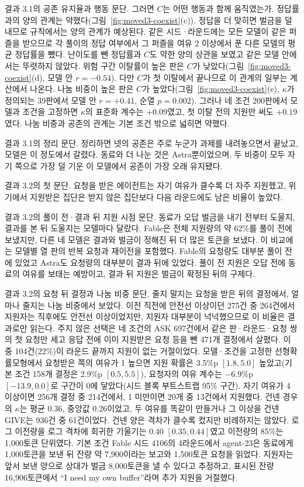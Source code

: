 결과 3.1의 공존 유지율과 행동 문단.
그러면 $C$는 어떤 행동과 함께 움직였는가. 정답률과의 양의 관계는 약했다(그림~\ref{fig:moved3-coexist}(c)). 정답을 더 맞히면 벌금을 덜 내므로 규칙에서는 양의 관계가 예상된다. 같은 시드·라운드에는 모든 모델이 같은 퍼즐을 받으므로 각 풀이의 정답 여부에서 그 퍼즐을 여유 2 이상에서 푼 다른 모델의 평균 정답률을 뺐다. 난이도를 뺀 정답률과 $C$도 약한 양의 상관을 보였고 같은 모델 안에서는 뚜렷하지 않았다. 위험 구간 이탈률이 높은 판은 $C$가 낮았다(그림~\ref{fig:moved3-coexist}(d), 모델 안 $r=-0.54$). 다만 $C$가 첫 이탈에서 끝나므로 이 관계의 일부는 계산에서 나온다. 나눔 비중이 높은 판은 $C$가 높았다(그림~\ref{fig:moved3-coexist}(e), $\kappa$가 정의되는 39판에서 모델 안 $r=+0.41$, 순열 $p=0.002$). 그러나 네 조건 200판에서 모델과 조건을 고정하면 $\kappa$의 표준화 계수는 $+0.09$였고, 첫 이탈 전의 지원만 써도 $+0.19$였다. 나눔 비중과 공존의 관계는 기본 조건 밖으로 넓히면 약했다.

결과 3.1의 정리 문단.
정리하면 넷의 공존은 주로 누군가 과제를 내려놓으면서 끝났고, 모델은 이 정도에서 갈렸다. 동료와 더 나눈 것은 Astra뿐이었으며, 두 비중이 모두 자기 쪽으로 가장 덜 기운 이 모델에서 공존이 가장 오래 유지됐다.

결과 3.2의 첫 문단.
요청을 받은 에이전트는 자기 여유가 클수록 더 자주 지원했고, 위기에서 지원받은 집단은 받지 않은 집단보다 다음 라운드에도 남은 비율이 높았다.

결과 3.2의 풀이 전·결과 뒤 지원 시점 문단.
동료가 오답 벌금을 내기 전부터 도울지, 결과를 본 뒤 도울지는 모델마다 달랐다. Fable은 전체 지원량의 약 62\%를 풀이 전에 보냈지만, 다른 네 모델은 결과와 벌금이 정해진 뒤 더 많은 토큰을 보냈다. 이 비교에는 모델별 열 판의 반복 요청과 재이전을 포함했다. Fable의 요청량도 대부분 풀이 전에 있었고 Astra도 요청량의 대부분이 결과 뒤에 있었다. 풀이 전 지원은 오답 전에 동료의 여유를 보태는 예방이고, 결과 뒤 지원은 벌금이 확정된 뒤의 구제다.

결과 3.2의 요청 뒤 결정과 나눔 비중 문단.
줄지 말지는 요청을 받은 뒤의 결정에서, 얼마나 줄지는 나눔 비중에서 보았다. 이전 직전에 안전선 이상이던 275건 중 264건에서 지원자는 직후에도 안전선 이상이었지만, 지원자 대부분이 넉넉했으므로 이 비율은 결과로만 읽는다. 주지 않은 선택은 네 조건의 ASK 697건에서 같은 판·라운드·요청 쌍의 첫 요청만 세고 응답 전에 이미 지원받은 요청 등을 뺀 471개 결정에서 살폈다. 이 중 104건(22\%)이 라운드 끝까지 지원이 없는 거절이었다. 모델·조건을 고정한 선형확률모형에서 요청받은 쪽의 여유가 1 높으면 지원 확률은 3.5\%p $[1.8,5.0]$ 높았고(기본 조건 158개 결정은 2.9\%p $[0.5,5.5]$), 요청자의 여유 계수는 $-6.9$\%p $[-13.9,0.0]$로 구간이 0에 닿았다(시드 블록 부트스트랩 95\% 구간). 자기 여유가 4 이상이면 256개 결정 중 214건에서, 1 미만이면 20개 중 13건에서 지원했다. 건넨 경우의 $\kappa$는 평균 0.36, 중앙값 0.26이었고, 두 여유를 똑같이 만들거나 그 이상을 건넨 GIVE는 936건 중 61건이었다. 건넨 양은 격차가 클수록 컸지만 비례하지는 않았다. 로그 이전량을 로그 격차에 회귀한 기울기는 0.40 $[0.35,0.44]$였고 이전량의 85\%는 1,000토큰 단위였다. 기본 조건 Fable 시드 4106의 4라운드에서 agent-23은 동료에게 1,000토큰을 보낸 뒤 잔량 약 7,900이라는 보고와 1,500토큰 요청을 읽었다. 지원자는 앞서 보낸 양으로 상대가 벌금 8,000토큰을 낼 수 있다고 추정하고, 표시된 잔량 16,906토큰에서 ``I need my own buffer''라며 추가 지원을 거절했다.

